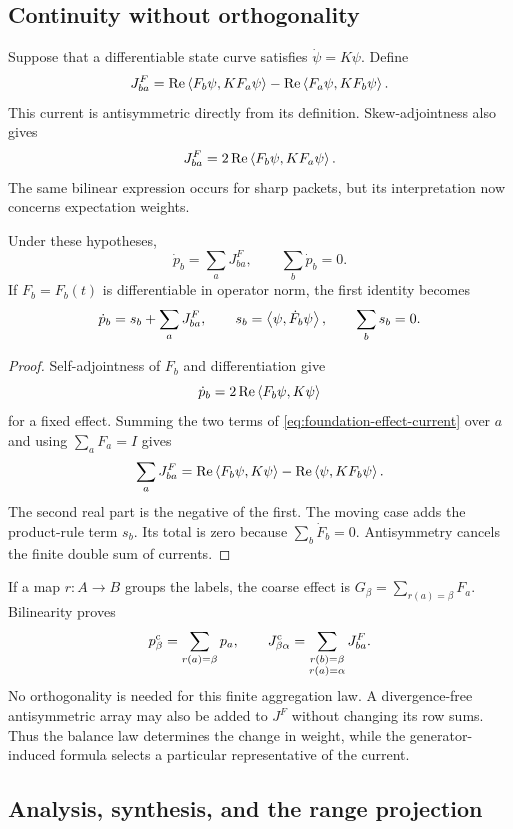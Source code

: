 \subsection{Continuity without orthogonality}

Suppose that a differentiable state curve satisfies $\dot\psi=K\psi$. Define
\begin{equation}
 J^{F}_{ba}=\operatorname{Re}\left\langle F_b\psi,KF_a\psi\right\rangle
             -\operatorname{Re}\left\langle F_a\psi,KF_b\psi\right\rangle.
 \label{eq:foundation-effect-current}
\end{equation}
This current is antisymmetric directly from its definition. Skew-adjointness also gives
\[
 J^F_{ba}=2\operatorname{Re}\left\langle F_b\psi,KF_a\psi\right\rangle.
\]
The same bilinear expression occurs for sharp packets, but its interpretation now concerns expectation weights.

\begin{proposition}
Under these hypotheses,
\[
 \dot p_b=\sum_a J^F_{ba},\qquad \sum_b\dot p_b=0.
\]
If $F_b=F_b(t)$ is differentiable in operator norm, the first identity becomes
\[
 \dot p_b=s_b+\sum_a J^F_{ba},\qquad
 s_b=\left\langle\psi,\dot F_b\psi\right\rangle,\qquad \sum_b s_b=0.
\]
\end{proposition}
\begin{proof}
Self-adjointness of $F_b$ and differentiation give
\[
 \dot p_b=2\operatorname{Re}\left\langle F_b\psi,K\psi\right\rangle
\]
for a fixed effect. Summing the two terms of \eqref{eq:foundation-effect-current} over $a$ and using $\sum_aF_a=I$ gives
\[
 \sum_aJ^F_{ba}=\operatorname{Re}\left\langle F_b\psi,K\psi\right\rangle
       -\operatorname{Re}\left\langle\psi,KF_b\psi\right\rangle.
\]
The second real part is the negative of the first. The moving case adds the product-rule term $s_b$. Its total is zero because $\sum_b\dot F_b=0$. Antisymmetry cancels the finite double sum of currents.
\end{proof}

If a map $r:A\to B$ groups the labels, the coarse effect is $G_\beta=\sum_{r(a)=\beta}F_a$. Bilinearity proves
\[
 p^{\rm c}_\beta=\sum_{r(a)=\beta}p_a,\qquad
 J^{\rm c}_{\beta\alpha}
 =\sum_{\substack{r(b)=\beta\\r(a)=\alpha}}J^F_{ba}.
\]
No orthogonality is needed for this finite aggregation law. A divergence-free antisymmetric array may also be added to $J^F$ without changing its row sums. Thus the balance law determines the change in weight, while the generator-induced formula selects a particular representative of the current.

\subsection{Analysis, synthesis, and the range projection}

